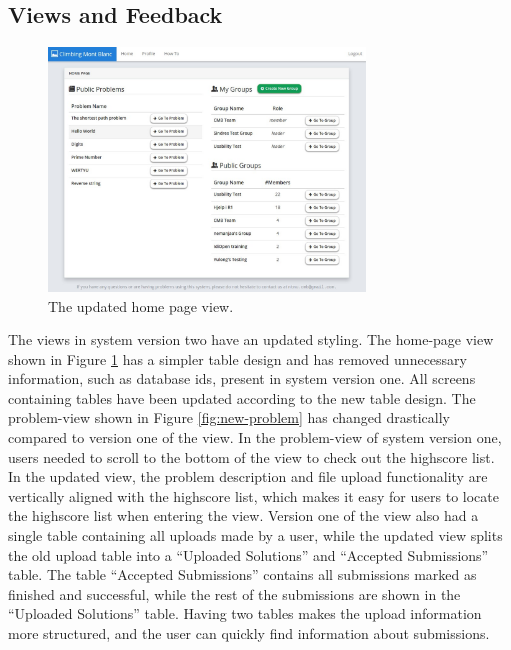 \subsection{Views and Feedback}
\label{sub-sec:impr-views-feedback}
\begin{figure}[b!]
    \centering
    \includegraphics[width=0.75\textwidth]{figs/new_homepage.jpg}
    \caption[The updated home page view]{The updated home page view.}
    \label{fig:new-homepage}
\end{figure}
The views in system version two have an updated styling. The home-page view shown in Figure \ref{fig:new-homepage} has a simpler table design and has removed unnecessary information, such as database ids, present in system version one. All screens containing tables have been updated according to the new table design. The problem-view shown in Figure \ref{fig:new-problem} has changed drastically compared to version one of the view. In the problem-view of system version one, users needed to scroll to the bottom of the view to check out the highscore list. In the updated view, the problem description and file upload functionality are vertically aligned with the highscore list, which makes it easy for users to locate the highscore list when entering the view. Version one of the view also had a single table containing all uploads made by a user, while the updated view splits the old upload table into a “Uploaded Solutions” and “Accepted Submissions” table. The table “Accepted Submissions” contains all submissions marked as finished and successful, while the rest of the submissions are shown in the “Uploaded Solutions” table. Having two tables makes the upload information more structured, and the user can quickly find information about submissions. \\

